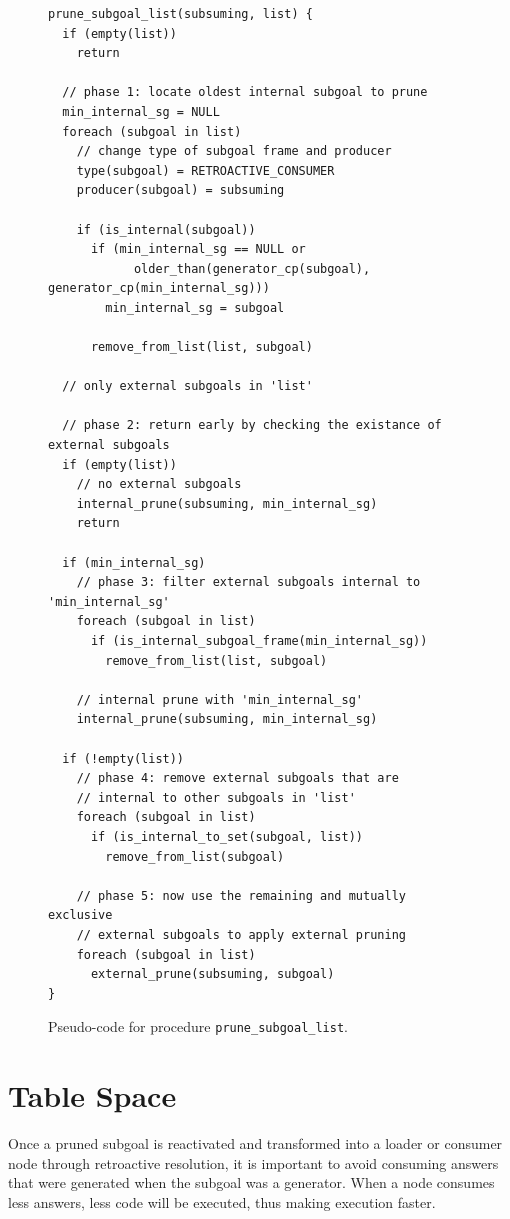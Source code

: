 \begin{figure}[ht]
\begin{Verbatim}
prune_subgoal_list(subsuming, list) {
  if (empty(list))
    return
    
  // phase 1: locate oldest internal subgoal to prune
  min_internal_sg = NULL
  foreach (subgoal in list)
    // change type of subgoal frame and producer
    type(subgoal) = RETROACTIVE_CONSUMER
    producer(subgoal) = subsuming
    
    if (is_internal(subgoal))
      if (min_internal_sg == NULL or
            older_than(generator_cp(subgoal), generator_cp(min_internal_sg)))
        min_internal_sg = subgoal
      
      remove_from_list(list, subgoal)
  
  // only external subgoals in 'list'
  
  // phase 2: return early by checking the existance of external subgoals
  if (empty(list))
    // no external subgoals
    internal_prune(subsuming, min_internal_sg)
    return
  
  if (min_internal_sg)
    // phase 3: filter external subgoals internal to 'min_internal_sg'
    foreach (subgoal in list)
      if (is_internal_subgoal_frame(min_internal_sg))
        remove_from_list(list, subgoal)
    
    // internal prune with 'min_internal_sg'
    internal_prune(subsuming, min_internal_sg)
  
  if (!empty(list))
    // phase 4: remove external subgoals that are
    // internal to other subgoals in 'list'
    foreach (subgoal in list)
      if (is_internal_to_set(subgoal, list))
        remove_from_list(subgoal)
    
    // phase 5: now use the remaining and mutually exclusive
    // external subgoals to apply external pruning
    foreach (subgoal in list)
      external_prune(subsuming, subgoal)
}
\end{Verbatim}
\caption{Pseudo-code for procedure \texttt{prune\_subgoal\_list}.}
\label{fig:prune_subgoal_list}
\end{figure}

\section{Table Space}

Once a pruned subgoal is reactivated and transformed into a loader or consumer node
through retroactive resolution, it is important to avoid consuming answers that
were generated when the subgoal was a generator. When a node consumes less answers,
less code will be executed, thus making execution faster.


